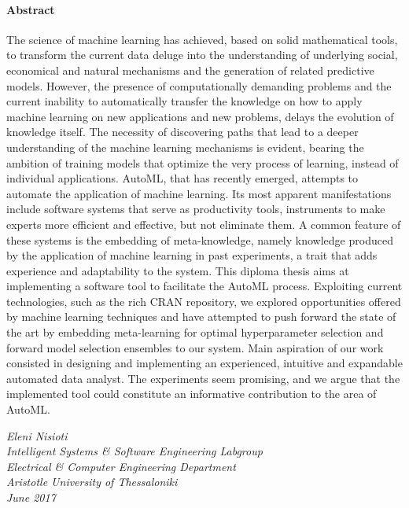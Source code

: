 {	\paragraph{Abstract}
	The science of machine learning has achieved, based on solid mathematical tools, to transform the current data deluge into the under\-standing of underlying social, economical and natural mechanisms and the generation of related predictive models. However, the presence of computa\-tionally demanding problems and the current inability to automatically transfer the knowledge on how to apply machine learning on new applications and new problems, delays the evolution of knowledge itself. The necessity of discovering paths that lead to a deeper understanding of the machine learning mecha\-nisms is evident, bearing the ambition of training models that optimize the very process of learning, instead of individual applications. \gls{AutoML}, that has recently emer\-ged, attempts to automate the application of machine learning. Its most apparent manifestations  include software systems that serve as productivity tools, instruments to make experts more efficient and effective, but not eliminate them. A common feature of these systems is the embed\-ding of meta-knowledge, namely knowledge produced by the application of machine learning in past experi\-ments, a trait that adds experience and adaptability to the system. This diploma thesis aims at implementing a software tool to facilitate the AutoML process. Exploiting current technologies, such as the rich CRAN repository, we explored opportunities offered by machine learning techni\-ques and have attempted to push forward the state of the art by embedding meta-learning for optimal hyperparameter selection and forward model selection ensembles to our system. Main aspiration of our work consisted in designing and implementing an experien\-ced, intuitive and expandable automated data analyst. The experiments  seem promising, and we argue that the implemented tool could constitute an informa\-tive contribu\-tion to the area of \gls{AutoML}.       
	
	\vspace{2cm}
	
	\begin{flushleft}
		\textit{Eleni Nisioti \\
		Intelligent Systems \& Software Engineering Labgroup\\
		Electrical \& Computer Engineering Department\\
		Aristotle University of Thessaloniki\\
		June 2017}
	\end{flushleft}
	
}
